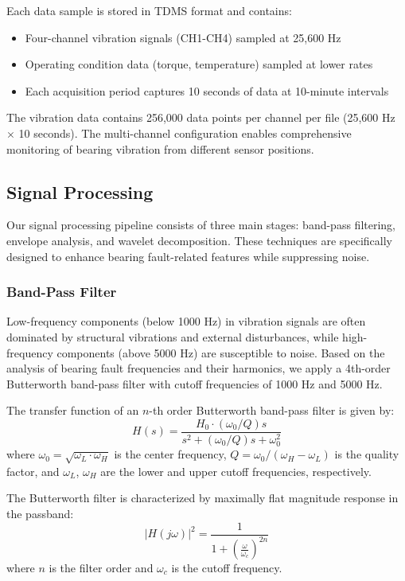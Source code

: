 \documentclass[conference,twocolumn]{IEEEtran}
\begin{document}
Each data sample is stored in TDMS format and contains:
\begin{itemize}
    \item Four-channel vibration signals (CH1-CH4) sampled at 25,600 Hz
    \item Operating condition data (torque, temperature) sampled at lower rates
    \item Each acquisition period captures 10 seconds of data at 10-minute intervals
\end{itemize}

The vibration data contains 256,000 data points per channel per file (25,600 Hz $\times$ 10 seconds). The multi-channel configuration enables comprehensive monitoring of bearing vibration from different sensor positions.

\subsection{Signal Processing}

Our signal processing pipeline consists of three main stages: band-pass filtering, envelope analysis, and wavelet decomposition. These techniques are specifically designed to enhance bearing fault-related features while suppressing noise.

\subsubsection{Band-Pass Filter}

Low-frequency components (below 1000 Hz) in vibration signals are often dominated by structural vibrations and external disturbances, while high-frequency components (above 5000 Hz) are susceptible to noise. Based on the analysis of bearing fault frequencies and their harmonics, we apply a 4th-order Butterworth band-pass filter with cutoff frequencies of 1000 Hz and 5000 Hz.

The transfer function of an $n$-th order Butterworth band-pass filter is given by:
\begin{equation}
    H(s) = \frac{H_0 \cdot (\omega_0/Q)s}{s^2 + (\omega_0/Q)s + \omega_0^2}
\end{equation}
where $\omega_0 = \sqrt{\omega_L \cdot \omega_H}$ is the center frequency, $Q = \omega_0/(\omega_H - \omega_L)$ is the quality factor, and $\omega_L$, $\omega_H$ are the lower and upper cutoff frequencies, respectively.

The Butterworth filter is characterized by maximally flat magnitude response in the passband:
\begin{equation}
    |H(j\omega)|^2 = \frac{1}{1 + \left(\frac{\omega}{\omega_c}\right)^{2n}}
\end{equation}
where $n$ is the filter order and $\omega_c$ is the cutoff frequency.
\end{document}
